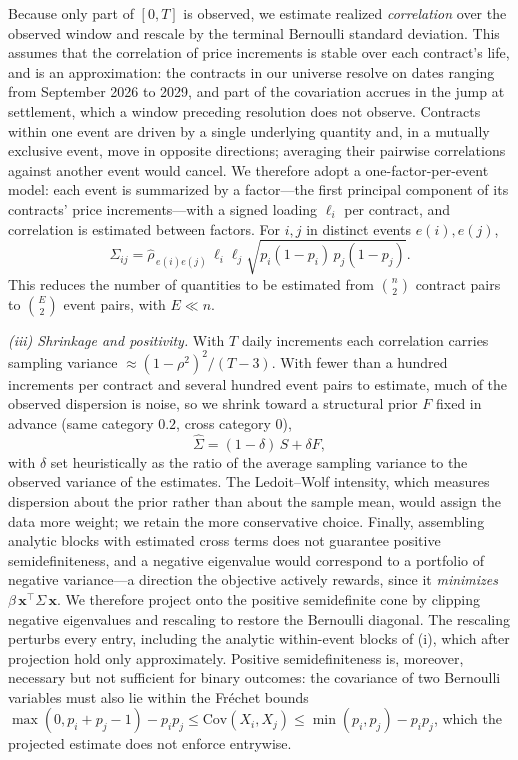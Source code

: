 \documentclass[aps, reprint, prl, twocolumn, superscriptaddress,amsmath,amssymb,noeprint]{revtex4-2}
\begin{document}
Because only part of $[0,T]$ is observed, we estimate realized
\emph{correlation} over the observed window and rescale by the terminal
Bernoulli standard deviation.  This assumes that the correlation of
price increments is stable over each contract's life, and is an
approximation: the contracts in our universe resolve on dates ranging
from September 2026 to 2029, and part of the covariation accrues in the
jump at settlement, which a window preceding resolution does not
observe.  Contracts within one event are driven by a
single underlying quantity and, in a mutually exclusive event, move in
opposite directions; averaging their pairwise correlations against
another event would cancel.  We therefore adopt a one-factor-per-event
model: each event is summarized by a
factor---the first principal component of its contracts' price
increments---with a signed loading $\ell_i$ per contract, and correlation
is estimated between factors.  For $i,j$ in distinct events $e(i),e(j)$,
\begin{equation}
  \Sigma_{ij} = \hat{\rho}_{\,e(i)e(j)}\,\ell_i \ell_j
                \sqrt{p_i(1-p_i)\,p_j(1-p_j)} .
\end{equation}
This reduces the number of quantities to be estimated from $\binom{n}{2}$
contract pairs to $\binom{E}{2}$ event pairs, with $E \ll n$.

\textit{(iii) Shrinkage and positivity.}  With $T$ daily increments each
correlation carries sampling variance $\approx (1-\rho^2)^2/(T-3)$.  With
fewer than a hundred increments per contract and several hundred event
pairs to estimate, much of the observed dispersion is noise, so we
shrink toward a structural prior $F$ fixed in advance (same category
$0.2$, cross category $0$),
\begin{equation}
  \hat{\Sigma} = (1-\delta)\,S + \delta F ,
\end{equation}
with $\delta$ set heuristically as the ratio of the average sampling
variance to the observed variance of the estimates.  The Ledoit--Wolf
intensity, which measures dispersion about the prior rather than about
the sample mean, would assign the data more weight; we retain the more
conservative choice.  Finally, assembling analytic blocks with
estimated cross terms does not guarantee positive semidefiniteness, and a
negative eigenvalue would correspond to a portfolio of negative
variance---a direction the objective actively rewards, since it
\emph{minimizes} $\beta\,\mathbf{x}^\top\Sigma\,\mathbf{x}$.  We therefore
project onto the positive semidefinite cone by clipping negative
eigenvalues and rescaling to restore the Bernoulli diagonal.  The
rescaling perturbs every entry, including the analytic within-event
blocks of (i), which after projection hold only approximately.
Positive semidefiniteness is, moreover, necessary but not sufficient for
binary outcomes: the covariance of two Bernoulli variables must also lie
within the Fr\'{e}chet bounds $\max(0,p_i+p_j-1)-p_ip_j \le
\text{Cov}(X_i,X_j) \le \min(p_i,p_j)-p_ip_j$, which the projected
estimate does not enforce entrywise.
\end{document}
